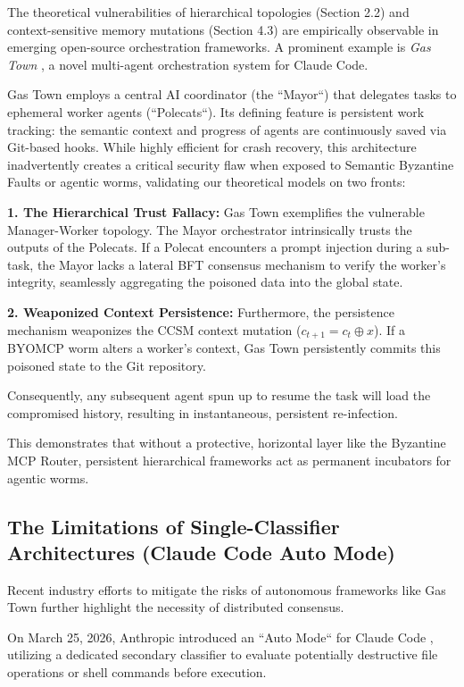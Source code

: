 \documentclass[a4paper,11pt,twocolumn]{article}
\theoremstyle{definition}
\theoremstyle{plain}
\begin{document}
The theoretical vulnerabilities of hierarchical topologies (Section 2.2) and context-sensitive memory mutations (Section 4.3) are empirically observable in emerging open-source orchestration frameworks. A prominent example is \textit{Gas Town} \cite{yegge2026gastown}, a novel multi-agent orchestration system for Claude Code.

Gas Town employs a central AI coordinator (the “Mayor“) that delegates tasks to ephemeral worker agents (“Polecats“). Its defining feature is persistent work tracking: the semantic context and progress of agents are continuously saved via Git-based hooks. While highly efficient for crash recovery, this architecture inadvertently creates a critical security flaw when exposed to Semantic Byzantine Faults or agentic worms, validating our theoretical models on two fronts:

\textbf{1. The Hierarchical Trust Fallacy:} 
Gas Town exemplifies the vulnerable Manager-Worker topology. The Mayor orchestrator intrinsically trusts the outputs of the Polecats. If a Polecat encounters a prompt injection during a sub-task, the Mayor lacks a lateral BFT consensus mechanism to verify the worker's integrity, seamlessly aggregating the poisoned data into the global state.

\textbf{2. Weaponized Context Persistence:} 
Furthermore, the persistence mechanism weaponizes the CCSM context mutation ($c_{t+1} = c_t \oplus x$). If a BYOMCP worm alters a worker's context, Gas Town persistently commits this poisoned state to the Git repository.

\pagebreak

Consequently, any subsequent agent spun up to resume the task will load the compromised history, resulting in instantaneous, persistent re-infection. 

This demonstrates that without a protective, horizontal layer like the Byzantine MCP Router, persistent hierarchical frameworks act as permanent incubators for agentic worms.

\subsection{The Limitations of Single-Classifier Architectures (Claude Code Auto Mode)}

Recent industry efforts to mitigate the risks of autonomous frameworks like Gas Town further highlight the necessity of distributed consensus.

On March 25, 2026, Anthropic introduced an “Auto Mode“ for Claude Code \cite{anthropic_automode_2026}, utilizing a dedicated secondary classifier to evaluate potentially destructive file operations or shell commands before execution.
\end{document}
